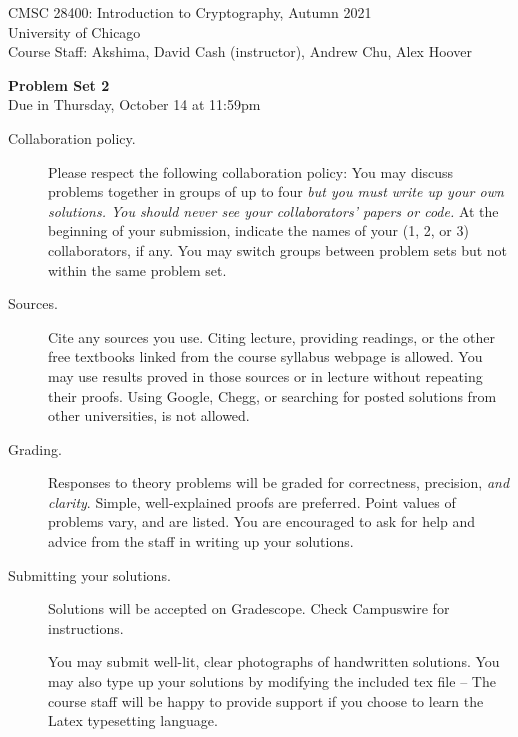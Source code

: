 \documentclass[11pt]{article}
\begin{document}
\sloppy

\noindent 
CMSC 28400: Introduction to Cryptography, Autumn 2021\\
University of Chicago\\
Course Staff: Akshima, David Cash (instructor), Andrew Chu, Alex Hoover

\begin{center}
\LARGE{\textbf{Problem Set 2}}\\
    \large{Due in Thursday, October 14 at 11:59pm}
\end{center}

\vspace{.1in}

\begin{description}

    \item[Collaboration policy.] Please respect the following collaboration
        policy:  You may discuss problems together in groups of up to four
        \emph{but you must write up your own solutions. You should never see
        your collaborators' papers or code.}  At the beginning of your
        submission, indicate the names of your (1, 2, or 3) collaborators, if
        any.   You may switch groups between problem sets but not within the
        same problem set.

    \item[Sources.] Cite any sources you use. Citing lecture, providing
    readings, or the other free textbooks linked from the course syllabus
    webpage is allowed. You may use results proved in those sources or in
    lecture without repeating their proofs.  Using Google, Chegg, or searching
    for posted solutions from other universities, is not allowed.

    \item[Grading.] Responses to theory problems will be graded for
        correctness, precision, \emph{and clarity}.  Simple, well-explained
        proofs are preferred.  Point values of problems vary, and are listed.  
        You are encouraged to ask for help and advice from the staff in writing
        up your solutions.

    \item[Submitting your solutions.] Solutions will be accepted on Gradescope.
    Check Campuswire for instructions.

    You may submit well-lit, clear photographs of handwritten solutions. You may
    also type up your solutions by modifying the included tex file -- The course
    staff will be happy to provide support if you choose to learn the Latex
    typesetting language.

\end{description}
\hrulefill
\end{document}
